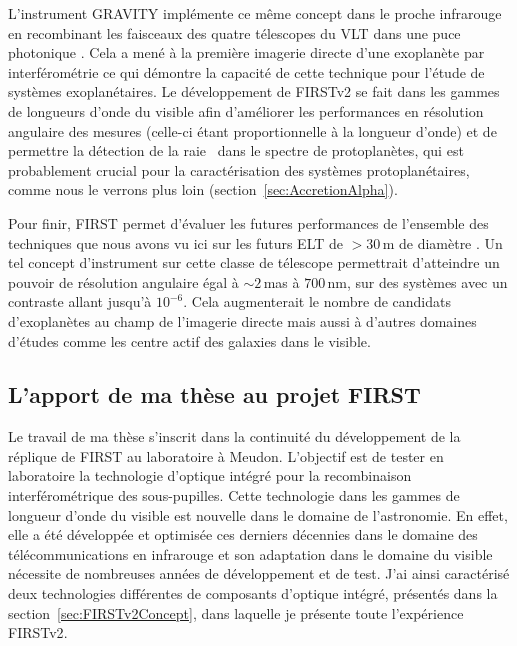 L'instrument \ac{GRAVITY} implémente ce même concept dans le proche infrarouge en recombinant les faisceaux des quatre télescopes du \ac{VLT} dans une puce photonique \cite{perraut2018}. Cela a mené à la première imagerie directe d'une exoplanète par interférométrie \citep{lacour2019} ce qui démontre la capacité de cette technique pour l'étude de systèmes exoplanétaires. Le développement de \ac{FIRSTv2} se fait dans les gammes de longueurs d'onde du visible afin d'améliorer les performances en résolution angulaire des mesures (celle-ci étant proportionnelle à la longueur d'onde) et de permettre la détection de la raie \ha~dans le spectre de protoplanètes, qui est probablement crucial pour la caractérisation des systèmes protoplanétaires, comme nous le verrons plus loin (section~\ref{sec:AccretionAlpha}).

Pour finir, \ac{FIRST} permet d'évaluer les futures performances de l'ensemble des techniques que nous avons vu ici sur les futurs \ac{ELT} de $> 30 \,$m de diamètre \citep{vievard2020b}. Un tel concept d'instrument sur cette classe de télescope permettrait d'atteindre un pouvoir de résolution angulaire égal à $\sim 2 \,$mas à $700 \,$nm, sur des systèmes avec un contraste allant jusqu'à $10 ^{-6}$. Cela augmenterait le nombre de candidats d'exoplanètes au champ de l'imagerie directe mais aussi à d'autres domaines d'études comme les centre actif des galaxies dans le visible.


\subsection{L'apport de ma thèse au projet FIRST}

Le travail de ma thèse s'inscrit dans la continuité du développement de la réplique de \ac{FIRST} au laboratoire à Meudon. L'objectif est de tester en laboratoire la technologie d'optique intégré pour la recombinaison interférométrique des sous-pupilles. Cette technologie dans les gammes de longueur d'onde du visible est nouvelle dans le domaine de l'astronomie. En effet, elle a été développée et optimisée ces derniers décennies dans le domaine des télécommunications en infrarouge et son adaptation dans le domaine du visible nécessite de nombreuses années de développement et de test. J'ai ainsi caractérisé deux technologies différentes de composants d'optique intégré, présentés dans la section~\ref{sec:FIRSTv2Concept}, dans laquelle je présente toute l'expérience \ac{FIRSTv2}. 

